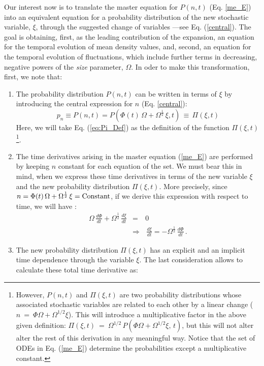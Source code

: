 Our interest now is to translate the master equation for $P(n,t)$ (Eq. \ref{me_E}) into an equivalent equation for a probability distribution of the new stochastic variable, $\xi$, through the suggested change of variables ---see Eq. (\ref{central}). The goal is obtaining, first, as the leading contribution of the expansion, an equation for the temporal evolution of mean density values, and, second, an equation for the temporal evolution of fluctuations, which include further terms in decreasing, negative powers of the {\em size} parameter, $\Omega$. In oder to make this transformation, first, we note that:
\begin{enumerate}
	\item The probability distribution $P(n,t)$ can be written in terms of $\xi$ by introducing the central expression for $n$ (Eq. \ref{central}):
	\begin{equation}
		\label{eq:Pi_Def}
		p_n \equiv P(n,t) = P(\Phi(t)\,\Omega + \Omega^{\frac{1}{2}}\,\xi,t)\,\equiv\,\Pi(\xi,t)
	\end{equation}
	Here, we will take Eq. (\ref{eq:Pi_Def}) as the definition of the function $\Pi(\xi,t)$\footnote{However, $P(n,t)$ and $\Pi(\xi,t)$ are two probability distributions whose associated stochastic variables are related to each other by a linear change ($n~=~\Phi\Omega+\Omega^{1/2}\xi$). This will introduce a multiplicative factor in the above given definition: $\Pi(\xi,t)~=~\Omega^{1/2}\,P(\Phi\Omega+\Omega^{1/2}\xi,\,t)$, but this will not alter alter the rest of this derivation in any meaningful way. Notice that the set of ODEs in Eq. (\ref{me_E}) determine the probabilities except a multiplicative constant.}.     
	\item The time derivatives arising in the master equation (\ref{me_E}) are performed by keeping $n$ constant for each equation of the set. We must bear this in mind, when we express these time derivatives in terms of the new variable $\xi$ and the new probability distribution $\Pi(\xi,t)$. More precisely, since $n=\Phi(t)\,\Omega + \Omega^{\frac{1}{2}}\,\xi=\textup{Constant}$, if we derive this expression with respect to time, we will have :
	\begin{eqnarray}
		\label{time_derivative}
		\Omega\,\frac{d\Phi}{dt}+\Omega^{\frac{1}{2}}\,\frac{d\xi}{dt} &=& 0\nonumber\\
		&\Rightarrow&\,\frac{d\xi}{dt}=-\Omega^{\frac{1}{2}}\,\frac{d\Phi}{dt}\,.
	\end{eqnarray}
	\item The new probability distribution $\Pi(\xi,t)$ has an explicit and an implicit time dependence through the variable $\xi$. The last consideration allows to calculate these total time derivative as:

\end{enumerate}
